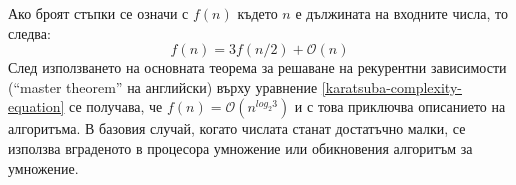   Ако броят стъпки се означи с $f(n)$ където $n$ е дължината на входните числа, то следва:
  \begin{equation}
    f(n) = 3f(n/2) + \mathcal{O}(n)
    \label{karatsuba-complexity-equation}
  \end{equation}
  След използването на основната теорема за решаване на рекурентни зависимости\cite[глава~4.5]{algo-intro} (``master theorem'' на английски) върху уравнение \ref{karatsuba-complexity-equation} се получава, че $f(n) = \mathcal{O}(n^{log_2 3})$ и с това приключва описанието на алгоритъма. В базовия случай, когато числата станат достатъчно малки, се използва вграденото в процесора умножение или обикновения алгоритъм за умножение.


